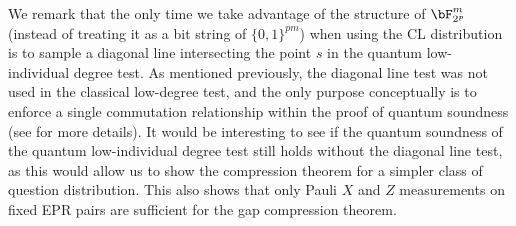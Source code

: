 We remark that the only time we take advantage of the structure of $\bF_{2^p}^m$ (instead of treating it as a bit string of $\{0,1\}^{pm}$) when using the CL distribution is to sample a diagonal line intersecting the point $s$ in the quantum low-individual degree test. As mentioned previously, the diagonal line test was not used in the classical low-degree test, and the only purpose conceptually is to enforce a single commutation relationship within the proof of quantum soundness (see \cite[Lemma 6.1]{jiQuantumSoundnessTesting2022} for more details). It would be interesting to see if the quantum soundness of the quantum low-individual degree test still holds without the diagonal line test, as this would allow us to show the compression theorem for a simpler class of question distribution. This also shows that only Pauli $X$ and $Z$ measurements on fixed EPR pairs are sufficient for the gap compression theorem. 



